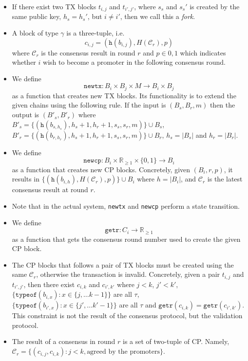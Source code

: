 \begin{itemize}
\item If there exist two TX blocks $t_{i,j}$ and $t_{i',j'}$, where $s_s$ and
  $s_s'$ is created by the same public key, $h_s = h_s'$, but $i \neq i'$, then
  we call this a \emph{fork}.

\item A block of type $\gamma$ is a three-tuple, i.e.
  $$c_{i,j} = (\texttt{h}(b_{i,j}), H(\mathcal{C}_r), p)$$
  where $\mathcal{C}_r$ is the consensus result in round $r$ and $p \in {0,1}$
  which indicates whether $i$ wish to become a promoter in the following
  consensus round.

\item We define
  $$\texttt{newtx}: B_i \times B_j \times M \rightarrow B_i \times B_j$$
  as a function that creates new TX blocks. Its functionality is to
  extend the given chains using the following rule. If the input is $(B_s, B_r,
  m)$ then the output is $(B'_s, B'_r)$ where $B'_s = \{(\texttt{h}(b_{s,h_s}), h_s + 1,
  h_r + 1, s_s, s_r, m)\} \cup B_s$, $B'_r = \{(\texttt{h}(b_{r, h_r}), h_s + 1, h_r + 1,
  s_s, s_r, m)\} \cup B_r$, $h_s = |B_s|$ and $h_r = |B_r|$.

\item We define
  $$\texttt{newcp}: B_i \times \mathbb{R}_{\ge 1} \times \{0, 1\} \rightarrow B_i$$
  as a function that creates new CP blocks. Concretely, given $(B_i, r, p)$, it
  results in $\{ (\texttt{h}(b_{i,h}), H(\mathcal{C}_r), p) \}\cup B_i$ where $h =
  |B_i|$, and $\mathcal{C}_r$ is the latest consensus result at round $r$.

\item Note that in the actual system, \texttt{newtx} and \texttt{newcp} perform
  a state transition.

\item We define
  $$\texttt{getr}: C_i \rightarrow \mathbb{R}_{\ge 1}$$
  as a function that gets the consensus round number used to create the given CP
  block.

\item The CP blocks that follows a pair of TX blocks must be created using the
  same $\mathcal{C}_r$, otherwise the transaction is invalid. Concretely, given
  a pair $t_{i,j}$ and $t_{i',j'}$, then there exist $c_{i, k}$ and $c_{i', k'}$
  where $j < k$, $j' < k'$, $\{ \texttt{typeof}(b_{i, x}) : x \in \{j, \dots k -
  1\}\}$ are all $\tau$, $ \{ \texttt{typeof}(b_{i', x}) : x \in \{ j', \dots k'
  - 1\} \}$ are all $\tau$ and $\texttt{getr}(c_{i, k}) = \texttt{getr}(c_{i',
    k'})$. This constraint is not the result of the consensus protocol, but the
  validation protocol.


\item The result of a consensus in round $r$ is a set of two-tuple of CP.
  Namely, $\mathcal{C}_r = \{ (c_{i,j}, c_{i,k}) : j < k, \text{agreed by the
    promoters}\}$.
\end{itemize}

